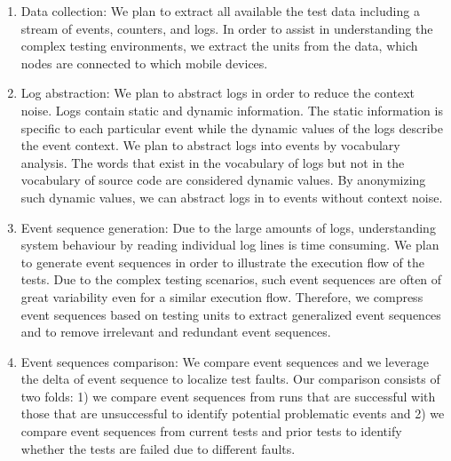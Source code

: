 \begin{enumerate}

\item Data collection: We plan to extract all available the test data including a stream of events, counters, and logs. In order to assist in understanding the complex testing environments, we extract the units from the data, \ie which nodes are connected to which mobile devices. 

\item Log abstraction: We plan to abstract logs in order to reduce the context noise. Logs contain static and dynamic information. The static information is specific to each particular event while the dynamic values of the logs describe the event context. We plan to abstract logs into events by vocabulary analysis. The words that exist in the vocabulary of logs but not in the vocabulary of source code are considered dynamic values. By anonymizing such dynamic values, we can abstract logs in to events without context noise. 

\item Event sequence generation: Due to the large amounts of logs, understanding system behaviour by reading individual log lines is time consuming. We plan to generate event sequences in order to illustrate the execution flow of the tests. Due to the complex testing scenarios, such event sequences are often of great variability even for a similar execution flow. Therefore, we compress event sequences based on testing units to extract generalized event sequences and to remove irrelevant and redundant event sequences.

\item Event sequences comparison: We compare event sequences and we leverage the delta of event sequence to localize test faults. Our comparison consists of two folds: 1) we compare event sequences from runs that are successful with those that are unsuccessful to identify potential problematic events and 2) we compare event sequences from current tests and prior tests to identify whether the tests are failed due to different faults.

\end{enumerate}


